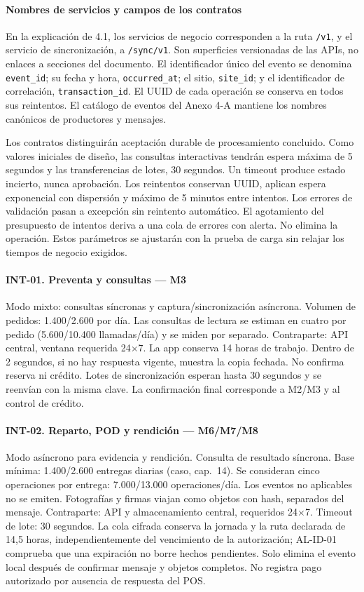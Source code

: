 \paragraph{Nombres de servicios y campos de los contratos}
En la explicación de 4.1, los servicios de negocio corresponden a la ruta \texttt{/v1}, y el servicio de sincronización, a \texttt{/sync/v1}. Son superficies versionadas de las APIs, no enlaces a secciones del documento. El identificador único del evento se denomina \texttt{event\_id}; su fecha y hora, \texttt{occurred\_at}; el sitio, \texttt{site\_id}; y el identificador de correlación, \texttt{transaction\_id}. El UUID de cada operación se conserva en todos sus reintentos. El catálogo de eventos del Anexo 4-A mantiene los nombres canónicos de productores y mensajes.

Los contratos distinguirán aceptación durable de procesamiento concluido. Como valores iniciales de diseño, las consultas interactivas tendrán espera máxima de 5 segundos y las transferencias de lotes, 30 segundos. Un timeout produce estado incierto, nunca aprobación. Los reintentos conservan UUID, aplican espera exponencial con dispersión y máximo de 5 minutos entre intentos. Los errores de validación pasan a excepción sin reintento automático. El agotamiento del presupuesto de intentos deriva a una cola de errores con alerta. No elimina la operación. Estos parámetros se ajustarán con la prueba de carga sin relajar los tiempos de negocio exigidos.

\paragraph{INT-01. Preventa y consultas — M3}
Modo mixto: consultas síncronas y captura/sincronización asíncrona. Volumen de pedidos: 1.400/2.600 por día. Las consultas de lectura se estiman en cuatro por pedido (5.600/10.400 llamadas/día) y se miden por separado. Contraparte: API central, ventana requerida 24$\times$7. La app conserva 14 horas de trabajo. Dentro de 2 segundos, si no hay respuesta vigente, muestra la copia fechada. No confirma reserva ni crédito. Lotes de sincronización esperan hasta 30 segundos y se reenvían con la misma clave. La confirmación final corresponde a M2/M3 y al control de crédito.

\paragraph{INT-02. Reparto, POD y rendición — M6/M7/M8}
Modo asíncrono para evidencia y rendición. Consulta de resultado síncrona. Base mínima: 1.400/2.600 entregas diarias (caso, cap.~14). Se consideran cinco operaciones por entrega: 7.000/13.000 operaciones/día. Los eventos no aplicables no se emiten. Fotografías y firmas viajan como objetos con hash, separados del mensaje. Contraparte: API y almacenamiento central, requeridos 24$\times$7. Timeout de lote: 30 segundos. La cola cifrada conserva la jornada y la ruta declarada de 14,5 horas, independientemente del vencimiento de la autorización; AL-ID-01 comprueba que una expiración no borre hechos pendientes. Solo elimina el evento local después de confirmar mensaje y objetos completos. No registra pago autorizado por ausencia de respuesta del POS.

